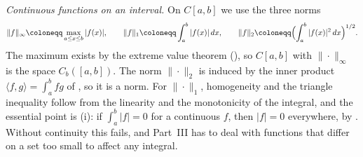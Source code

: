 \emph{Continuous functions on an interval.} On $C[a,b]$ we use the three norms
\[
\|f\|_\infty\coloneqq\max_{a\le x\le b}|f(x)|,\qquad\|f\|_1\coloneqq\int_a^b|f(x)|\,dx,\qquad\|f\|_2\coloneqq\Bigl(\int_a^b|f(x)|^2\,dx\Bigr)^{1/2}.
\]
The maximum exists by the extreme value theorem (), so $C[a,b]$ with $\|\cdot\|_\infty$ is the space $C_b([a,b])$. The norm $\|\cdot\|_2$ is induced by the inner product $\langle f,g\rangle=\int_a^bfg$ of , so it is a norm. For $\|\cdot\|_1$, homogeneity and the triangle inequality follow from the linearity and the monotonicity of the integral, and the essential point is (i): if $\int_a^b|f|=0$ for a continuous $f$, then $|f|=0$ everywhere, by . Without continuity this fails, and Part~III has to deal with functions that differ on a set too small to affect any integral.

